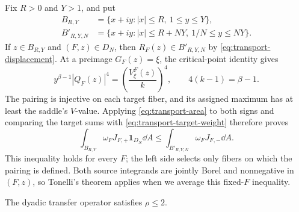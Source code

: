 Fix $R>0$ and $Y>1$, and put
\begin{align*}
 B_{R,Y}&=\{x+iy:|x|\leq R,\ 1\leq y\leq Y\},\\
 B'_{R,Y,N}&=\{x+iy:|x|\leq R+NY,\ 1/N\leq y\leq NY\}.
\end{align*}
If $z\in B_{R,Y}$ and $(F,z)\in D_N$, then
$R_F(z)\in B'_{R,Y,N}$ by \eqref{eq:transport-displacement}.
At a preimage $G_F(z)=\xi$, the critical-point identity gives
\begin{equation}\label{eq:transport-target-weight}
 y^{\beta-1}|Q_F(z)|^4
   =\left(\frac{V^F_\xi(z)}k\right)^4,
 \qquad 4(k-1)=\beta-1.
\end{equation}
The pairing is injective on each target fiber, and its assigned
maximum has at least the saddle's $V$-value.  Applying
\eqref{eq:transport-area} to both signs and comparing the target
sums with \eqref{eq:transport-target-weight} therefore proves
\begin{equation}\label{eq:transport-box}
 \int_{B_{R,Y}}\omega_FJ_{F,+}\mathbf 1_{D_N}\dd A
 \leq
 \int_{B'_{R,Y,N}}\omega_FJ_{F,-}\dd A.
\end{equation}
This inequality holds for every $F$; the left side selects only
fibers on which the pairing is defined.
Both source integrands are jointly Borel and nonnegative in $(F,z)$,
so Tonelli's theorem applies when we average this fixed-$F$ inequality.

\begin{proposition}\label{prop:transfer-bound}
 The dyadic transfer operator satisfies $\rho\leq2$.
\end{proposition}

